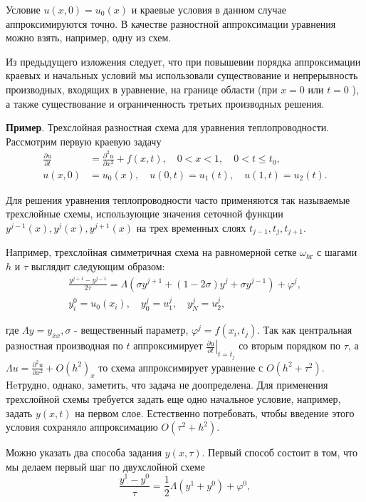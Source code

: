 Условие $u(x, 0)=u_0(x)$ и краевые условия в данном случае аппроксимируются точно. В качестве разностной аппроксимации уравнения можно взять, например, одну из схем.

Из предыдущего изложения следует, что при повышевии порядка аппроксимации краевых и начальных условий мы использовали существование и непрерывность производных, входящих в уравнение, на границе области (при $x=0$ или $t=0$ ), а также существование и ограниченность третьих производных решения.

\textbf{Пример}. Трехслойная разностная схема для уравнения теплопроводности. Рассмотрим первую краевую задачу
$$
\begin{aligned}
	\frac{\partial u}{\partial t} & =\frac{\partial^2 u}{\partial x^2}+f(x, t), \quad 0<x<1, \quad 0<t \leqslant t_0, \\
	u(x, 0) & =u_0(x), \quad u(0, t)=u_1(t), \quad u(1, t)=u_2(t) .
\end{aligned}
$$

Для решения уравнения теплопроводности часто применяются так называемые трехслойные схемы, использующие значения сеточной функции $y^{j-1}(x), y^j(x), y^{j+1}(x)$ на трех временных слоях $t_{j-1}, t_j, t_{j+1}$.

Например, трехслойная симметричная схема на равномерной сетке $\omega_{h г}$ с шагами $h$ и $\tau$ выглядит следующим образом:
$$
\begin{gathered}
	\frac{y^{j+1}-y^{j-1}}{2 \tau}=\Lambda\left(\sigma y^{j+1}+(1-2 \sigma) y^j+\sigma y^{j-1}\right)+\varphi^j, \\
	y_i^0=u_0\left(x_i\right), \quad y_0^j=u_1^j, \quad y_N^j=u_2^j,
\end{gathered}
$$

где $\Lambda y=y_{\overline{x} x}, \sigma$ - вещественный параметр, $\varphi^j=f\left(x_i, t_j\right)$.
Так как центральная разностная производная по $t$ аппроксимирует $\left.\frac{\partial u}{\partial t}\right|_{t=t_j}$ со вторым порядком по $\tau$, а $\Lambda u=\frac{\partial^2 u}{\partial x^2}+O\left(h^2\right)_x$ то схема аппроксимирует уравнение с $O\left(h^2+\tau^2\right)$. Heтрудно, однако, заметить, что задача не доопределена. Для применения трехслойной схемы требуется задать еще одно начальное условие, например, задать $y(x, t)$ на первом слое. Естественно потребовать, чтобы введение этого условия сохраняло аппроксимацию $O\left(\tau^2+h^2\right)$.

Можно указать два способа задания $y(x, \tau)$. Первый способ состоит в том, что мы делаем первый шаг по двухслойной схеме
$$
\frac{y^1-y^0}{\tau}=\frac{1}{2} \Lambda\left(y^1+y^0\right)+\varphi^0,
$$

